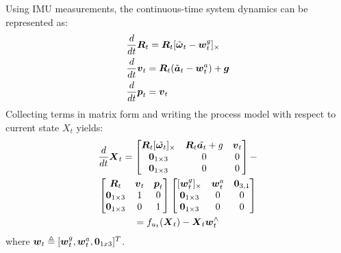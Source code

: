 Using IMU measurements, the continuous-time system dynamics can be represented as:
\begin{align}
    & \frac{d}{dt}\boldsymbol{R}_t = \boldsymbol{R}_t[\tilde{\boldsymbol{\omega}}_t - \boldsymbol{w}^g_t]_\times \label{eqn:rot_dyn}\\
    & \frac{d}{dt}\boldsymbol{v}_t = \boldsymbol{R}_t(\tilde{\boldsymbol{a}}_t-\boldsymbol{w}^a_t) + \boldsymbol{g} \label{eqn:vel_dyn}\\
    & \frac{d}{dt}\boldsymbol{p}_t = \boldsymbol{v}_t \label{eqn:pos_dyn}
\end{align}
Collecting terms in matrix form and writing the process model with respect to current state $X_t$ yields:
\begin{multline}
    \frac{d}{dt}\boldsymbol{X}_t =
    \begin{bmatrix}
        \boldsymbol{R}_t[\tilde{\boldsymbol{\omega}_t}]_\times & \boldsymbol{R}_t\tilde{\boldsymbol{a}_t} + g & \boldsymbol{v}_t \\
        \boldsymbol{0}_{1 \times 3} & 0 & 0 \\
        \boldsymbol{0}_{1 \times 3} & 0 & 0
    \end{bmatrix}
    - \\
    \begin{bmatrix}
        \boldsymbol{R}_t & \boldsymbol{v}_t & \boldsymbol{p}_t \\
        \boldsymbol{0}_{1 \times 3} & 1 & 0 \\
        \boldsymbol{0}_{1 \times 3} & 0 & 1 
    \end{bmatrix}
    \begin{bmatrix}
        [\boldsymbol{w}^g_t]_\times & \boldsymbol{w}^a_t & \boldsymbol{0}_{3,1} \\
        \boldsymbol{0}_{1 \times 3} & 0 & 0 \\
        \boldsymbol{0}_{1 \times 3} & 0 & 0
    \end{bmatrix}\\
     = f_{u_t}(\boldsymbol{X}_t) - \boldsymbol{X}_t\boldsymbol{w}_t^\wedge
\end{multline}
where $\boldsymbol{w}_t \triangleq [\boldsymbol{w}^g_t, \boldsymbol{w}^a_t, \boldsymbol{0}_{1x3}]^T$.

